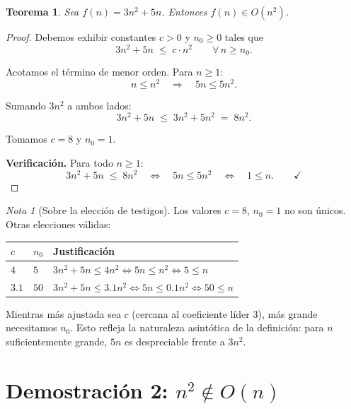 \documentclass[11pt, letterpaper]{article}
\theoremstyle{definition}
\theoremstyle{plain}
\newtheorem{theorem}{Teorema}[section]
\theoremstyle{remark}
\newtheorem*{remark}{Nota}
\begin{document}
\begin{theorem}\label{thm:3n2-bigo}
  Sea $f(n) = 3n^2 + 5n$. Entonces $f(n) \in O(n^2)$.
\end{theorem}

\begin{proof}
  Debemos exhibir constantes $c > 0$ y $n_0 \geq 0$ tales que
  \[
    3n^2 + 5n \;\leq\; c \cdot n^2
    \qquad \forall\, n \geq n_0.
  \]

  Acotamos el término de menor orden. Para $n \geq 1$:
  \[
    n \leq n^2
    \quad\Longrightarrow\quad
    5n \leq 5n^2.
  \]

  Sumando $3n^2$ a ambos lados:
  \[
    3n^2 + 5n \;\leq\; 3n^2 + 5n^2 \;=\; 8n^2.
  \]

  Tomamos $c = 8$ y $n_0 = 1$.

  \textbf{Verificación.} Para todo $n \geq 1$:
  \[
    3n^2 + 5n \;\leq\; 8n^2
    \quad\Longleftrightarrow\quad
    5n \leq 5n^2
    \quad\Longleftrightarrow\quad
    1 \leq n.
    \qquad\checkmark
  \]
\end{proof}

\begin{remark}[Sobre la elección de testigos]
  Los valores $c = 8$, $n_0 = 1$ no son únicos. Otras elecciones válidas:

  \begin{center}
  \begin{tabular}{lll}
    \toprule
    $c$ & $n_0$ & Justificación \\
    \midrule
    $4$   & $5$  & $3n^2 + 5n \leq 4n^2 \iff 5n \leq n^2 \iff 5 \leq n$ \\
    $3.1$ & $50$ & $3n^2 + 5n \leq 3.1n^2 \iff 5n \leq 0.1n^2 \iff 50 \leq n$ \\
    \bottomrule
  \end{tabular}
  \end{center}

  Mientras más ajustada sea $c$ (cercana al coeficiente líder $3$),
  más grande necesitamos $n_0$. Esto refleja la naturaleza asintótica
  de la definición: para $n$ suficientemente grande, $5n$ es
  despreciable frente a $3n^2$.
\end{remark}


\section{Demostración 2: \texorpdfstring{$n^2 \notin O(n)$}{n² ∉ O(n)}}
\end{document}
